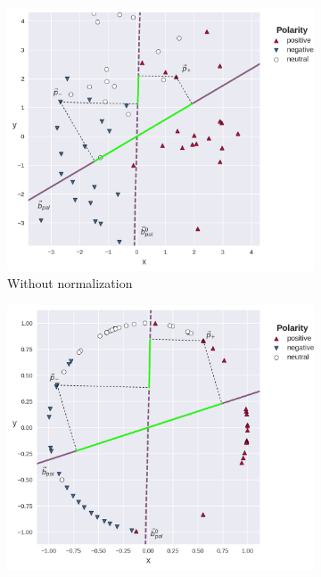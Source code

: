\begin{figure}[hbt!]
  {
    \centering
    \begin{subfigure}{.5\textwidth}
      \centering
      \includegraphics[width=\linewidth]{img/sentilex_polarity_not_normed.png}
      \caption{Without normalization}\label{snt-lex:fig:nwe-no-norm}
    \end{subfigure}%
    \begin{subfigure}{.5\textwidth}
      \centering
      \includegraphics[width=\linewidth]{img/sentilex_polarity_len_normed.png}

\end{subfigure}}
\end{figure}
